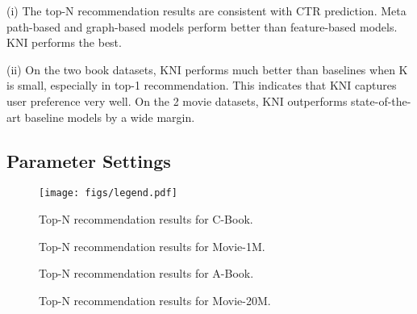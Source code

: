 \documentclass[sigconf]{acmart}
\begin{document}
(i) The top-N recommendation results are consistent with CTR prediction. Meta path-based and graph-based models perform better than feature-based models. KNI performs the best.
    
(ii) On the two book datasets, KNI performs much better than baselines when K is small, especially in top-1 recommendation. This indicates that KNI captures user preference very well. On the 2 movie datasets, KNI outperforms state-of-the-art baseline models by a wide margin.

\subsection{Parameter Settings}\label{sec:param}

\begin{figure*}
    \centering
    \texttt{[image: figs/legend.pdf]}
    \vspace{-10pt}
    \caption{Top-N recommendation results for C-Book.} \label{fig:topk_bc} \vspace{10pt}
     \vspace{-10pt}
    \caption{Top-N recommendation results for Movie-1M.} \label{fig:topk_m1} \vspace{10pt}
     \vspace{-10pt}
    \caption{Top-N recommendation results for A-Book.} \label{fig:topk_ab} \vspace{10pt}
     \vspace{-10pt}
    \caption{Top-N recommendation results for Movie-20M.} \label{fig:topk_m20}
\end{figure*}
\end{document}
